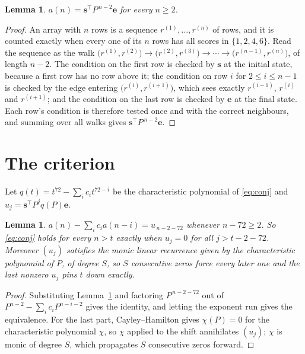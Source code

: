\documentclass[11pt,a4paper]{article}
\theoremstyle{plain}
\newtheorem{lemma}[theorem]{Lemma}
\theoremstyle{definition}
\begin{document}
\begin{lemma}\label{lem:walk}
$a(n)=\mathbf{s}^{\!\top}P^{\,n-2}\mathbf{e}$ for every $n\ge2$.
\end{lemma}

\begin{proof}
An array with $n$ rows is a sequence $r^{(1)},\dots,r^{(n)}$ of rows, and it is counted
exactly when every one of its $n$ rows has all scores in $\{1,2,4,6\}$. Read the sequence as the
walk $\bigl(r^{(1)},r^{(2)}\bigr)\to\bigl(r^{(2)},r^{(3)}\bigr)\to\cdots\to
\bigl(r^{(n-1)},r^{(n)}\bigr)$, of length $n-2$. The condition on the first row is
checked by $\mathbf{s}$ at the initial state, because a first row has no row above it; the
condition on row $i$ for $2\le i\le n-1$ is checked by the edge entering
$\bigl(r^{(i)},r^{(i+1)}\bigr)$, which sees exactly $r^{(i-1)}$, $r^{(i)}$ and
$r^{(i+1)}$; and the condition on the last row is checked by $\mathbf{e}$ at the final
state. Each row's condition is therefore tested once and with the correct neighbours, and
summing over all walks gives $\mathbf{s}^{\!\top}P^{\,n-2}\mathbf{e}$.
\end{proof}

\section{The criterion}

Let $q(t)=t^{72}-\sum_i c_i t^{72-i}$ be the characteristic polynomial of
\eqref{eq:conj} and $u_j=\mathbf{s}^{\!\top}P^{j}q(P)\mathbf{e}$.

\begin{lemma}\label{lem:crit}
$a(n)-\sum_i c_i a(n-i)=u_{\,n-2-72}$ whenever $n-72\ge2$. So \eqref{eq:conj}
holds for every $n>t$ exactly when $u_j=0$ for all $j>t-2-72$. Moreover $(u_j)$
satisfies the monic linear recurrence given by the characteristic polynomial of $P$, of
degree $S$, so $S$ consecutive zeros force every later one and the last nonzero $u_j$ pins
$t$ down exactly.
\end{lemma}

\begin{proof}
Substituting Lemma~\ref{lem:walk} and factoring $P^{\,n-2-72}$ out of
$P^{n-2}-\sum_i c_i P^{n-i-2}$ gives the identity, and letting the exponent run gives the
equivalence. For the last part, Cayley--Hamilton gives $\chi(P)=0$ for the characteristic
polynomial $\chi$, so $\chi$ applied to the shift annihilates $(u_j)$; $\chi$ is monic of
degree $S$, which propagates $S$ consecutive zeros forward.
\end{proof}
\end{document}
